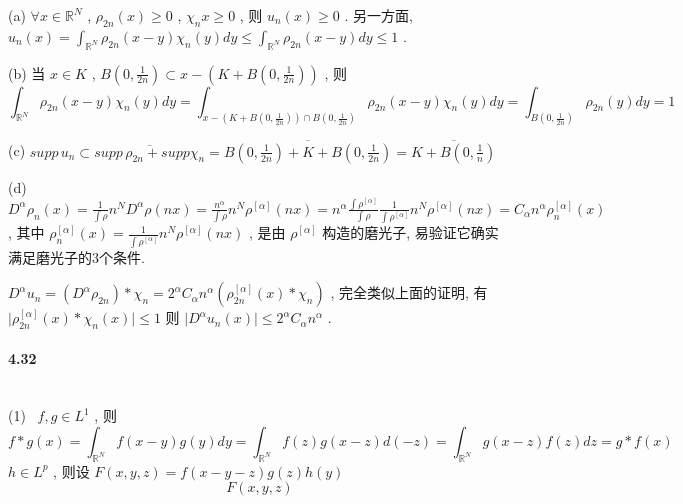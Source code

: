 \documentclass[a4paper, UTF8]{ctexart}				%
\numberwithin{equation}{section}				%
\begin{document}
	(a) $\forall x \in \mathbb{R}^N$ , $\rho_{2n}(x) \ge 0$ , $\chi_n{x} \ge 0$ , 则 $u_n(x) \ge 0$ .
	另一方面, $u_n(x) = \int^{ }_{\mathbb{R}^N} \rho_{2n}(x - y)\chi_n(y)dy \le \int^{ }_{\mathbb{R}^N} \rho_{2n}(x - y) dy \le 1$ .

	(b) 当 $x \in K$ , $B(0 ,\frac{1}{2n}) \subset x - (K + B(0 ,\frac{1}{2n}))$ ,
	则 
	\[
		\int^{ }_{\mathbb{R}^N} \rho_{2n}(x - y) \chi_n(y) dy = \int^{ }_{x - (K + B(0 ,\frac{1}{2n})) \cap B(0 ,\frac{1}{2n})} \rho_{2n}(x - y) \chi_n(y) dy = \int^{ }_{B(0, \frac{1}{2n})} \rho_{2n}(y)dy = 1
	\]
	
	(c) $supp \, u_n \subset \overline{supp \, \rho_{2n} + supp \chi_n} = \overline{B(0, \frac{1}{2n}) + K + B(0, \frac{1}{2n})} = \overline{K + B(0, \frac{1}{n})}$

	(d) $D^\alpha \rho_n(x) = \frac{1}{\int \rho} n^N D^\alpha \rho(nx) = \frac{n^\alpha}{\int \rho} n^N \rho^{[\alpha]}(nx) = n^\alpha \frac{\int \rho^{[\alpha]}}{\int \rho} \frac{1}{\int \rho^{[\alpha]}} n^N \rho^{[\alpha]}(nx) = C_\alpha n^\alpha \rho^{[\alpha]}_n(x)$ ,
	其中 $\rho^{[\alpha]}_n(x) = \frac{1}{\int \rho^{[\alpha]}} n^N \rho^{[\alpha]}(nx)$ , 是由 $\rho^{[\alpha]}$ 构造的磨光子, 易验证它确实满足磨光子的3个条件.

	$D^\alpha u_n = (D^\alpha \rho_{2n})*\chi_n = 2^\alpha C_\alpha n^\alpha (\rho^{[\alpha]}_{2n}(x)*\chi_n)$ , 完全类似上面的证明, 有 $\vert{\rho^{[\alpha]}_{2n}(x)*\chi_n(x)}\vert \le 1$ 则 $\vert{D^\alpha u_n(x)}\vert \le 2^\alpha C_ \alpha n^\alpha$ .\\

	\paragraph{4.32}\quad\\
	\noindent(1) \, $f, g \in L^1$ , 则 
	\[
		f*g(x) = \int^{ }_{\mathbb{R}^N} f(x - y) g(y) dy = \int^{ }_{\mathbb{R}^N} f(z) g(x - z) d(-z) = \int^{ }_{\mathbb{R}^N} g(x - z) f(z) dz = g*f(x)
	\]
	$h \in L^p$ , 则设 $F(x, y, z) = f(x - y - z) g(z) h(y)$
	\[
		F(x, y, z) 
	\]
	
\end{document}
